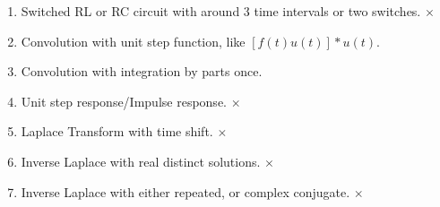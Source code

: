 \documentclass[nobib]{tufte-handout}
\begin{document}
\begin{enumerate}
    \item Switched RL or RC circuit with around 3 time intervals or two switches. $\times$
    \item Convolution with unit step function, like $[f(t)u(t)]*u(t)$. 
    \item Convolution with integration by parts once. 
    \item Unit step response/Impulse response. $\times$
    \item Laplace Transform with time shift. $\times$
    \item Inverse Laplace with real distinct solutions. $\times$
    \item Inverse Laplace with either repeated, or complex conjugate. $\times$
\end{enumerate}
\end{document}
